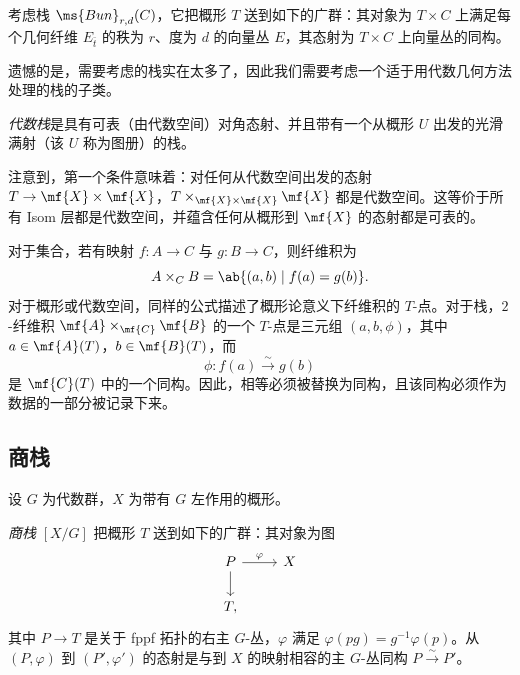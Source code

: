 \begin{exm}
    考虑栈 \(\ms{Bun}_{r,d}(C)\)，它把概形 \(T\) 送到如下的广群：其对象为 \(T\times C\) 上满足每个几何纤维 \(E_{\bar t}\) 的秩为 \(r\)、度为 \(d\) 的向量丛 \(E\)，其态射为 \(T\times C\) 上向量丛的同构。
\end{exm}

遗憾的是，需要考虑的栈实在太多了，因此我们需要考虑一个适于用代数几何方法处理的栈的子类。

\begin{defn}
    \textit{代数栈}是具有可表（由代数空间）对角态射、并且带有一个从概形 \(U\) 出发的光滑满射（该 \(U\) 称为图册）的栈。 
\end{defn}

注意到，第一个条件意味着：对任何从代数空间出发的态射 \(T \to \mf{X} \times \mf{X}\)，\(T \times_{\mf{X} \times \mf{X}} \mf{X}\) 都是代数空间。这等价于所有 Isom 层都是代数空间，并蕴含任何从概形到 \(\mf{X}\) 的态射都是可表的。

\begin{rmk}
    对于集合，若有映射 \(f\colon A\to C\) 与 \(g\colon B\to C\)，则纤维积为
    \[ 
        A\times_C B=\ab\{(a,b)\mid f(a)=g(b)\}. 
    \] 
    对于概形或代数空间，同样的公式描述了概形论意义下纤维积的 \(T\)-点。对于栈，\(2\)-纤维积 \(\mf{A}\times_{\mf{C}}\mf{B}\) 的一个 \(T\)-点是三元组 \((a,b,\phi)\)，其中 \(a\in\mf{A}(T)\)，\(b\in\mf{B}(T)\)，而
    \[ 
        \phi\colon f(a)\xrightarrow{\sim}g(b) 
    \]
    是 \(\mf{C}(T)\) 中的一个同构。因此，相等必须被替换为同构，且该同构必须作为数据的一部分被记录下来。
\end{rmk}


\subsection{商栈}%
\label{sub:Quotient stacks}

设 \(G\) 为代数群，\(X\) 为带有 \(G\) 左作用的概形。

\begin{defn}
    \textit{商栈} \([X/G]\) 把概形 \(T\) 送到如下的广群：其对象为图
    \begin{equation*}
    \begin{tikzcd}
        P \ar{r}{\varphi} \ar{d} & X \\
        T,
    \end{tikzcd}
    \end{equation*}
    其中 \(P\to T\) 是关于 fppf 拓扑的右主 \(G\)-丛，\(\varphi\) 满足 \(\varphi(pg)=g^{-1}\varphi(p)\)。从 \((P,\varphi)\) 到 \((P',\varphi')\) 的态射是与到 \(X\) 的映射相容的主 \(G\)-丛同构 \(P\xrightarrow{\sim}P'\)。
\end{defn}

